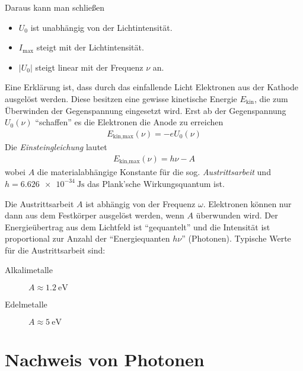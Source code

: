 Daraus kann man schließen
\begin{itemize}
\item $U_0$ ist unabhängig von der Lichtintensität.
\item $I_\text{max}$ steigt mit der Lichtintensität.
\item $|U_0|$ steigt linear mit der Frequenz $\nu$ an.
\end{itemize}
Eine Erklärung ist, dass durch das einfallende Licht Elektronen aus
der Kathode ausgelöst werden. Diese besitzen eine gewisse kinetische
Energie $E_\text{kin}$, die zum Überwinden der Gegenspannung
eingesetzt wird.
Erst ab der Gegenspannung $U_0(\nu)$ \enquote{schaffen} es die
Elektronen die Anode zu erreichen
\begin{gather*}
  E_{\text{kin,max}}(\nu) = -e U_0(\nu)
\end{gather*}
Die \emph{Einsteingleichung} lautet
\begin{gather*}
  E_{\text{kin,max}}(\nu) = h\nu - A
\end{gather*}
wobei 
$A$ 
die materialabhängige Konstante für die sog. \emph{Austrittsarbeit} und
$h=\SI{6.626e-34}{\J\s}$%
das Plank'sche Wirkungsquantum ist.


Die Austrittsarbeit $A$ ist abhängig von der Frequenz $\omega$.
Elektronen können nur dann aus dem Festkörper ausgelöst werden, wenn
$A$ überwunden wird.
Der Energieübertrag aus dem Lichtfeld ist \enquote{gequantelt} und die
Intensität ist proportional zur Anzahl der \enquote{Energiequanten
  $h\nu$} (Photonen).
Typische Werte für die Austrittsarbeit sind:
\begin{description}
\item[Alkalimetalle] $A\approx \SI{1.2}{\electronvolt}$
\item[Edelmetalle] $A\approx \SI{5}{\electronvolt}$
\end{description}


\section{Nachweis von Photonen}
\cite[siehe][Kap. 5.1.4, Halbleitersensoren]{zinth}


